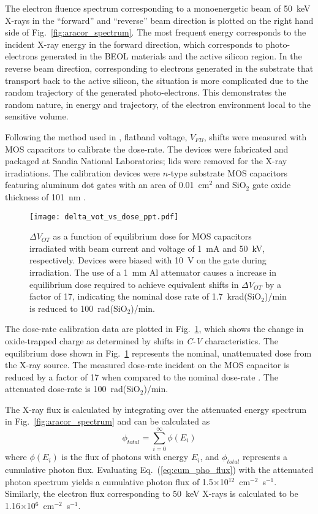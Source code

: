 The electron fluence spectrum corresponding to a monoenergetic beam of 50~keV X-rays in the ``forward'' and ``reverse'' beam direction is plotted on the right hand side of Fig.~\ref{fig:aracor_spectrum}.
The most frequent energy corresponds to the incident X-ray energy in the forward direction, which corresponds to photo-electrons generated in the BEOL materials and the active silicon region.
In the reverse beam direction, corresponding to electrons generated in the substrate that transport back to the active silicon, the situation is more complicated due to the random trajectory of the generated photo-electrons. 
This demonstrates the random nature, in energy and trajectory, of the electron environment local to the sensitive volume.

Following the method used in \cite{Fleetwood:1986ug}, flatband voltage, $V_{FB}$, shifts were measured with MOS capacitors to calibrate the dose-rate. 
The devices were fabricated and packaged at Sandia National Laboratories; lids were removed for the X-ray irradiations. 
The calibration devices were $n$-type substrate MOS capacitors featuring aluminum dot gates with an area of 0.01~cm$^2$ and SiO$_2$ gate oxide thickness of 101~nm \cite{Schwank:1987fq}. 
\begin{figure}[tb]
    \centering
        \texttt{[image: delta\_vot\_vs\_dose\_ppt.pdf]}
    \caption{$\Delta V_{OT}$ as a function of equilibrium dose for MOS capacitors irradiated with beam current and voltage of 1~mA and 50~kV, respectively. Devices were biased with 10~V on the gate during irradiation. The use of a 1~mm Al attenuator causes a increase in equilibrium dose required to achieve equivalent shifts in $\Delta V_{OT}$ by a factor of 17, indicating the nominal dose rate of 1.7~krad(SiO$_2$)/min is reduced to 100~rad(SiO$_2$)/min.}
    \label{fig:delta_vot_vs_dose}
\end{figure}
The dose-rate calibration data are plotted in Fig.~\ref{fig:delta_vot_vs_dose}, which shows the change in oxide-trapped charge as determined by shifts in \emph{C-V} characteristics.
The equilibrium dose shown in Fig.~\ref{fig:delta_vot_vs_dose} represents the nominal, unattenuated dose from the X-ray source. 
The measured dose-rate incident on the MOS capacitor is reduced by a factor of 17 when compared to the nominal dose-rate \cite{Fleetwood:1986ug}. 
The attenuated dose-rate is 100~rad(SiO$_2$)/min. 

The X-ray flux is calculated by integrating over the attenuated energy spectrum in Fig.~\ref{fig:aracor_spectrum} and can be calculated as
\begin{equation}
    \label{eq:cum_pho_flux}
    \phi_{total} = \sum_{i=0}^{\infty} \phi(E_{i})
\end{equation}
where $\phi(E_{i})$ is the flux of photons with energy $E_{i}$, and $\phi_{total}$ represents a cumulative photon flux. 
Evaluating Eq.~(\ref{eq:cum_pho_flux}) with the attenuated photon spectrum yields a cumulative photon flux of 1.5$\times$10$^{12}$~cm$^{-2}$~s$^{-1}$.
Similarly, the electron flux corresponding to 50~keV X-rays is calculated to be 1.16$\times$10$^{6}$~cm$^{-2}$~s$^{-1}$.

